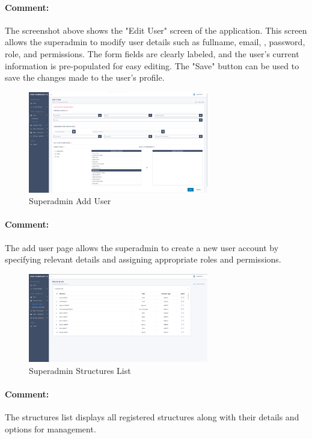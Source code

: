 \begin{itemize}
  \paragraph{Comment:} The screenshot above shows the "Edit User" screen of the application. This screen allows the superadmin to modify user details such as fullname, email, , password, role, and permissions. The form fields are clearly labeled, and the user's current information is pre-populated for easy editing. The "Save" button can be used to save the changes made to the user's profile.
\newpage 
\begin{figure}[htbp]
  \centering
  \includegraphics[width=0.7\textwidth]{SCREENSHOTS/superadmin/add_user.png}
  \caption{Superadmin Add User}
  \label{fig:add-user}
\end{figure}
\paragraph{Comment:} The add user page allows the superadmin to create a new user account by specifying relevant details and assigning appropriate roles and permissions.

\begin{figure}[htbp]
  \centering
  \includegraphics[width=0.7\textwidth]{SCREENSHOTS/superadmin/structures_list.png}
  \caption{Superadmin Structures List}
  \label{fig:structures-list}
\end{figure}
\paragraph{Comment:} The structures list displays all registered structures along with their details and options for management.
\newpage 


\end{itemize}
